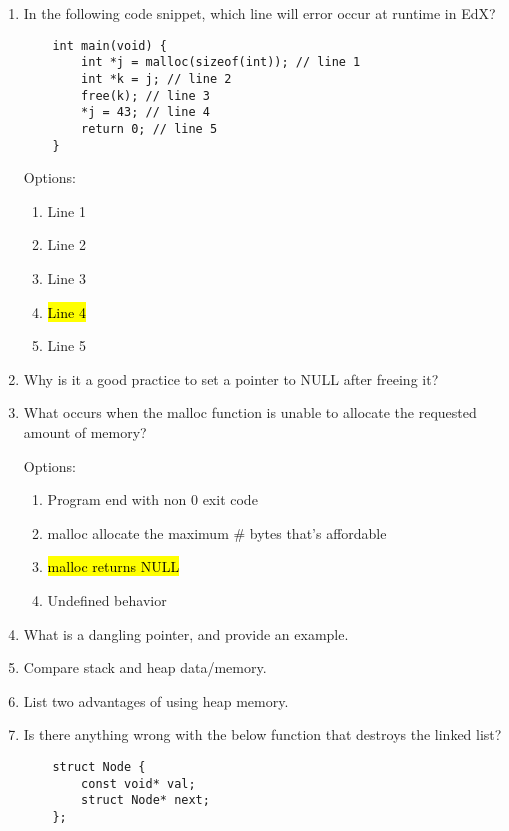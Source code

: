 \documentclass{article}
\begin{document}
\begin{enumerate}
\begin{enumerate}[label=\alph*.]
    \end{enumerate}
    \item In the following code snippet, which line will error occur at runtime in EdX?
    \begin{lstlisting}
    int main(void) {
        int *j = malloc(sizeof(int)); // line 1
        int *k = j; // line 2
        free(k); // line 3
        *j = 43; // line 4
        return 0; // line 5
    }
    \end{lstlisting}
    Options:
    \begin{enumerate}[label=\alph*.]
        \item Line 1
        \item Line 2
        \item Line 3
        \item \hl{Line 4}
        \item Line 5
    \end{enumerate}
    \item Why is it a good practice to set a pointer to NULL after freeing it?
    \vspace{16mm}
    \item What occurs when the malloc function is unable to allocate the requested amount of memory?

    Options:
    \begin{enumerate}[label=\alph*.]
        \item Program end with non 0 exit code
        \item malloc allocate the maximum \# bytes that’s affordable
        \item \hl{malloc returns NULL}
        \item Undefined behavior
    \end{enumerate}
    \item What is a dangling pointer, and provide an example.
    \vspace{16mm}
    \item Compare stack and heap data/memory.
    \vspace{16mm}
    \item List two advantages of using heap memory.
    \vspace{16mm}

    \item Is there anything wrong with the below function that destroys the linked list?
    \begin{lstlisting}
    struct Node {
        const void* val;
        struct Node* next;
    };


\end{lstlisting}
\end{enumerate}
\end{document}

